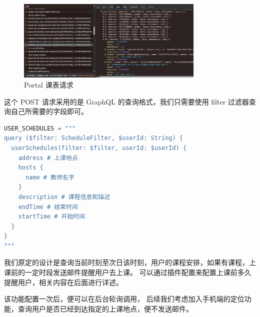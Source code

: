 \begin{figure}[H]
    \centering
    \includegraphics[width=0.8\textwidth]{img/calendar-new-url.png}
    \caption{Portal 课表请求}
    \label{fig:portal_course_table}
\end{figure}

这个 POST 请求采用的是 GraphQL 的查询格式，我们只需要使用 filter 过滤器查询自己所需要的字段即可。

\begin{lstlisting}[language=python]
USER_SCHEDULES = """
query ($filter: ScheduleFilter, $userId: String) {
  userSchedules(filter: $filter, userId: $userId) {
    address # 上课地点
    hosts {
      name # 教师名字
    }
    description # 课程信息和描述
    endTime # 结束时间
    startTime # 开始时间
  }
}
""" \end{lstlisting}

我们原定的设计是查询当前时刻至次日该时刻，用户的课程安排，如果有课程，上课前的一定时段发送邮件提醒用户去上课。
可以通过插件配置来配置上课前多久提醒用户，相关内容在后面进行详述。

\begin{rmr}
    该功能配置一次后，便可以在后台轮询调用，
    后续我们考虑加入手机端的定位功能，查询用户是否已经到达指定的上课地点，便不发送邮件。
\end{rmr}